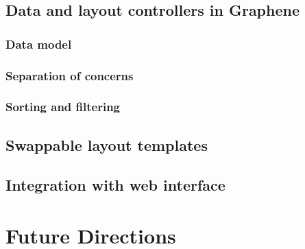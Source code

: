 \subsection{Data and layout controllers in Graphene}
\subsubsection{Data model}
\subsubsection{Separation of concerns}
\subsubsection{Sorting and filtering}
\subsection{Swappable layout templates}
\subsection{Integration with web interface}

\section{Future Directions}

